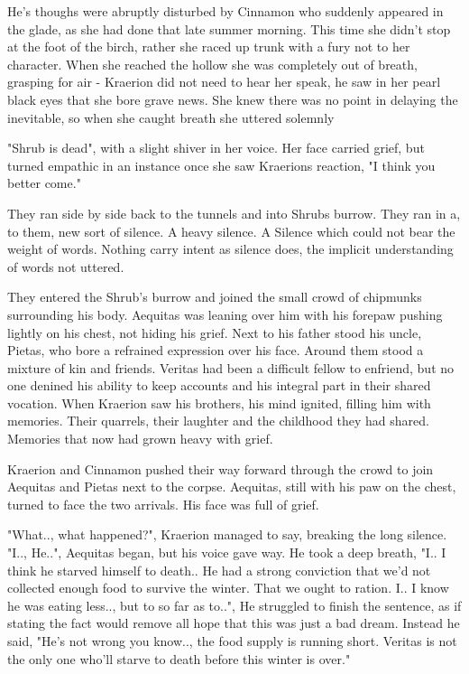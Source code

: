 \documentclass[smalldemyvopaper,11pt,twoside,onecolumn,openright,extrafontsizes]{memoir}
\begin{document}
He's thoughs were abruptly disturbed by Cinnamon who suddenly appeared in the glade, as she had done that late summer morning. This time she didn't stop at the foot of the birch, rather she raced up trunk with a fury not to her character. When she reached the hollow she was completely out of breath, grasping for air - Kraerion did not need to hear her speak, he saw in her pearl black eyes that she bore grave news. She knew there was no point in delaying the inevitable, so when she caught breath she uttered solemnly 

"Shrub is dead", with a slight shiver in her voice. Her face carried grief, but turned empathic in an instance once she saw Kraerions reaction, "I think you better come."

They ran side by side back to the tunnels and into Shrubs burrow. They ran in a, to them, new sort of silence. A heavy silence. A Silence which could not bear the weight of words. Nothing carry intent as silence does, the implicit understanding of words not uttered. 

They entered the Shrub's burrow and joined the small crowd of chipmunks surrounding his body. Aequitas was leaning over him with his forepaw pushing lightly on his chest, not hiding his grief. Next to his father stood his uncle, Pietas, who bore a refrained expression over his face. Around them stood a mixture of kin and friends. Veritas had been a difficult fellow to enfriend, but no one denined his ability to keep accounts and his integral part in their shared vocation. When Kraerion saw his brothers, his mind ignited, filling him with memories. Their  quarrels, their laughter and the childhood they had shared. Memories that now had grown heavy with grief.

Kraerion and Cinnamon pushed their way forward through the crowd to join Aequitas and Pietas next to the corpse. Aequitas, still with his paw on the chest, turned to face the two arrivals. His face was full of grief. 

"What.., what happened?", Kraerion managed to say, breaking the long silence.
"I.., He..", Aequitas began, but his voice gave way. He took a deep breath, "I.. I think he starved himself to death.. He had a strong conviction that we'd not collected enough food to survive the winter. That we ought to ration. I.. I know he was eating less.., but to so far as to..", He struggled to finish the sentence, as if stating the fact would remove all hope that this was just a bad dream. Instead he said, "He's not wrong you know.., the food supply is running short. Veritas is not the only one who'll starve to death before this winter is over."
\end{document}
